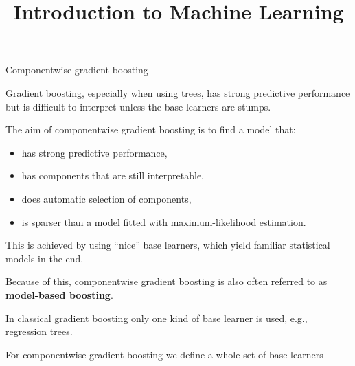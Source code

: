  






\newcommand{\titlefigure}{figure_man/componentwise-gb.png}
\newcommand{\learninggoals}{
  \item \textcolor{blue}{XXX}
  \item \textcolor{blue}{XXX}
}

\title{Introduction to Machine Learning}
\date{}




\begin{vbframe}{Componentwise gradient boosting}

Gradient boosting, especially when using trees, has strong predictive
performance but is difficult to interpret unless the base learners are stumps.

\lz

The aim of componentwise gradient boosting is to find a model that:

\begin{itemize}
  \item
    has strong predictive performance,

  \item
    has components that are still interpretable,

  \item
    does automatic selection of components,

  \item
    is sparser than a model fitted with maximum-likelihood estimation.
\end{itemize}

\lz

This is achieved by using \enquote{nice} base learners, which yield familiar statistical models
in the end.

\lz

Because of this, componentwise gradient boosting is also often referred to as \textbf{model-based boosting}.

\framebreak

In classical gradient boosting only one kind of base learner is used, e.g., regression trees.

\lz

For componentwise gradient boosting we define a whole set of base learners


\end{vbframe}
